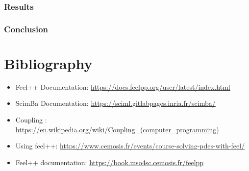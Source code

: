 \documentclass[12pt]{article}
\begin{document}
\newpage

\section{Results}


\newpage

\section{Conclusion}


\newpage

\part*{Bibliography}




\begin{itemize}
    \item Feel++ Documentation: \url{https://docs.feelpp.org/user/latest/index.html}
    \item ScimBa Documentation: \url{https://sciml.gitlabpages.inria.fr/scimba/}
    \item Coupling : \url{https://en.wikipedia.org/wiki/Coupling_(computer_programming)}
    \item Using feel++:
    \url{https://www.cemosis.fr/events/course-solving-pdes-with-feel/}
    \item Feel++ documentation:
    \url{https://book.mso4sc.cemosis.fr/feelpp}

\end{itemize}
\end{document}
